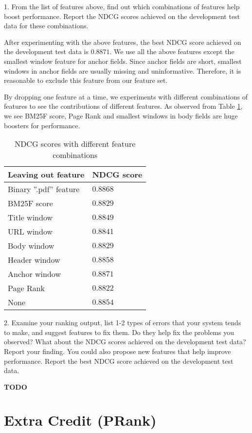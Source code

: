 1. From the list of features above, find out which combinations of features help boost
performance. Report the NDCG scores achieved on the development test data
for these combinations.

After experimenting with the above features, the best NDCG score achieved on the development test data is $0.8871$.
We use all the above features except the smallest window feature for anchor fields.
Since anchor fields are short, smallest windows in anchor fields are usually missing and uninformative.
Therefore, it is reasonable to exclude this feature from our feature set.

By dropping one feature at a time, we experiments with different combinations of features to see the contributions of different features. As observed from Table \ref{tab:perform}, we see BM25F score, Page Rank and smallest windows in body fields are huge boosters for performance.
\begin{table}
\begin{center}
\begin{tabular}{|l|l|}
  \hline
  Leaving out feature & NDCG score \\
  \hline
  Binary ''.pdf'' feature & $0.8868$ \\
  BM25F score & $0.8829$ \\
  Title window & $0.8849$ \\
  URL window & $0.8841$ \\
  Body window & $0.8829$ \\
  Header window & $0.8858$ \\
  Anchor window & $\mathbf{0.8871}$ \\
  Page Rank & $0.8822$ \\
  None & $0.8854$ \\
  \hline
\end{tabular}
\caption{NDCG scores with different feature combinations}\label{tab:perform}
\end{center}
\end{table}


2. Examine your ranking output, list 1-2 types of errors that your system tends
to make, and suggest features to fix them. Do they help fix the problems you
observed? What about the NDCG scores achieved on the development test data?
Report your finding. You could also propose new features that help improve performance.
Report the best NDCG score achieved on the development test data.

\textbf{TODO}


\section*{Extra Credit (PRank)}

